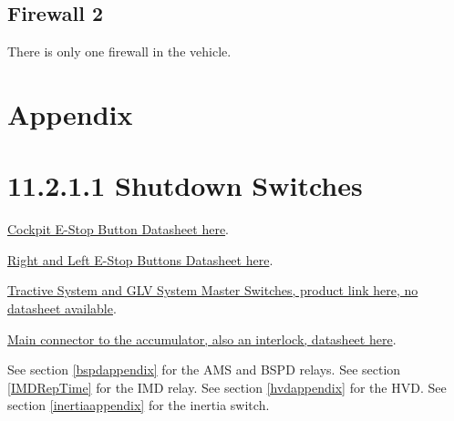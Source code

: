 \documentclass{article}
\begin{document}
    \subsection{Firewall 2}
        There is only one firewall in the vehicle.
    
\newpage          

\section{Appendix}
\section*{11.2.1.1 Shutdown Switches} \label{shutdownappendix}

\href{http://products.eao.com/index.php?IdTreeGroup=2344&IdProduct=48667&lang=en}{Cockpit E-Stop Button Datasheet here}.

\href{http://products.eao.com/index.php?IdTreeGroup=2344&IdProduct=48533&lang=en}{Right and Left E-Stop Buttons Datasheet here}.

\href{http://www.amazon.com/Volt-Battery-Disconnect-Kill-Switch/dp/B007O0BBFM}{Tractive System and GLV System Master Switches, product link here, no datasheet available}.

\href{http://www.mouser.com/pdfdocs/9876510101.PDF}{Main connector to the accumulator, also an interlock, datasheet here}.

See section \ref{bspdappendix} for the AMS and BSPD relays. 
See section \ref{IMDRepTime} for the IMD relay.
See section \ref{hvdappendix} for the HVD.
See section \ref{inertiaappendix} for the inertia switch.
\end{document}
